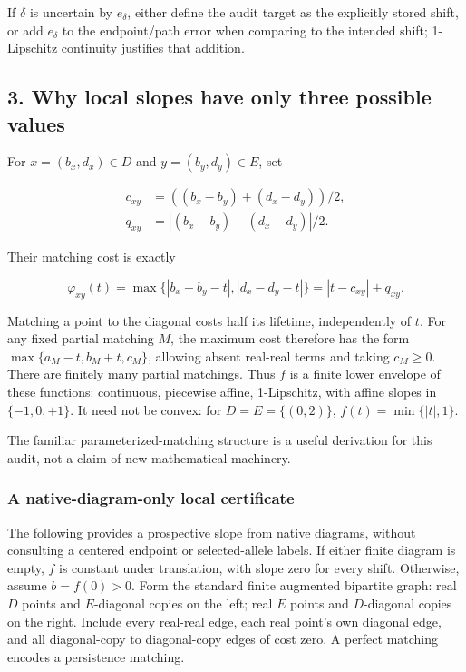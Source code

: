 \documentclass[
  11pt,
]{article}
\begin{document}
If \(\delta\) is uncertain by \(e_\delta\), either define the audit
target as the explicitly stored shift, or add \(e_\delta\) to the
endpoint/path error when comparing to the intended shift; 1-Lipschitz
continuity justifies that addition.

\subsection{3. Why local slopes have only three possible
values}\label{why-local-slopes-have-only-three-possible-values}

For \(x=(b_x,d_x)\in D\) and \(y=(b_y,d_y)\in E\), set

\[
\begin{aligned}c_{xy}&=((b_x-b_y)+(d_x-d_y))/2,\\ q_{xy}&=|(b_x-b_y)-(d_x-d_y)|/2.\end{aligned}
\]

Their matching cost is exactly

\[
\varphi_{xy}(t)=\max\{|b_x-b_y-t|,|d_x-d_y-t|\}=|t-c_{xy}|+q_{xy}.
\]

Matching a point to the diagonal costs half its lifetime, independently
of \(t\). For any fixed partial matching \(M\), the maximum cost
therefore has the form \(\max\{a_M-t,b_M+t,c_M\}\), allowing absent
real-real terms and taking \(c_M\geq 0\). There are finitely many
partial matchings. Thus \(f\) is a finite lower envelope of these
functions: continuous, piecewise affine, 1-Lipschitz, with affine slopes
in \(\{-1,0,+1\}\). It need not be convex: for \(D=E=\{(0,2)\}\),
\(f(t)=\min\{|t|,1\}\).

The familiar parameterized-matching structure is a useful derivation for
this audit, not a claim of new mathematical machinery.

\subsubsection{A native-diagram-only local
certificate}\label{a-native-diagram-only-local-certificate}

The following provides a prospective slope from native diagrams, without
consulting a centered endpoint or selected-allele labels. If either
finite diagram is empty, \(f\) is constant under translation, with slope
zero for every shift. Otherwise, assume \(b=f(0)>0\). Form the standard
finite augmented bipartite graph: real \(D\) points and \(E\)-diagonal
copies on the left; real \(E\) points and \(D\)-diagonal copies on the
right. Include every real-real edge, each real point's own diagonal
edge, and all diagonal-copy to diagonal-copy edges of cost zero. A
perfect matching encodes a persistence matching.
\end{document}
